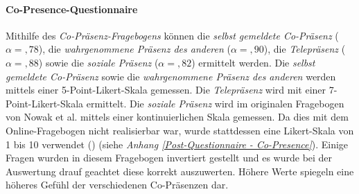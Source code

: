 \documentclass[a4paper,11pt]{article}%
\renewcommand{\\}{\vspace*{0.5\baselineskip} \newline}
\begin{document}
		\paragraph{Co-Presence-Questionnaire}
Mithilfe des \textit{Co-Präsenz-Fragebogens} können die \textit{selbst gemeldete Co-Präsenz} ($\alpha =,78$), die \textit{wahrgenommene Präsenz des anderen} ($\alpha =,90$), die \textit{Telepräsenz} ($\alpha =,88$) sowie die \textit{soziale Präsenz} ($\alpha =,82$) ermittelt werden. Die \textit{selbst gemeldete Co-Präsenz} sowie die \textit{wahrgenommene Präsenz des anderen} werden mittels einer 5-Point-Likert-Skala gemessen. Die \textit{Telepräsenz} wird mit einer 7-Point-Likert-Skala ermittelt. Die \textit{soziale Präsenz} wird im originalen Fragebogen von Nowak et al. mittels einer kontinuierlichen Skala gemessen. Da dies mit dem Online-Fragebogen nicht realisierbar war, wurde stattdessen eine Likert-Skala von 1 bis 10 verwendet (\citep[S. 487]{nowak2003effect}) (siehe \textit{Anhang \ref{Post-Questionnaire - Co-Presence}}). Einige Fragen wurden in diesem Fragebogen invertiert gestellt und es wurde bei der Auswertung drauf geachtet diese korrekt auszuwerten. Höhere Werte spiegeln eine höheres Gefühl der verschiedenen Co-Präsenzen dar.
\clearpage
\newpage
\end{document}
